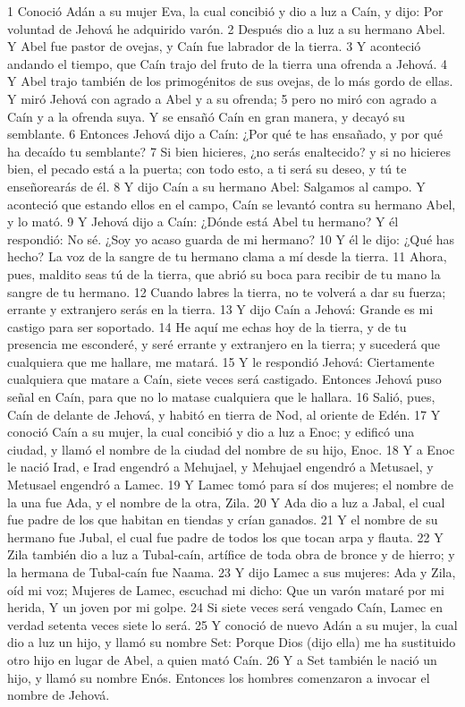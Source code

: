 1 Conoció Adán a su mujer Eva, la cual concibió y dio a luz a Caín, y dijo: Por voluntad de Jehová he adquirido varón.
2 Después dio a luz a su hermano Abel. Y Abel fue pastor de ovejas, y Caín fue labrador de la tierra.
3 Y aconteció andando el tiempo, que Caín trajo del fruto de la tierra una ofrenda a Jehová.
4 Y Abel trajo también de los primogénitos de sus ovejas, de lo más gordo de ellas. Y miró Jehová con agrado a Abel y a su ofrenda;
5 pero no miró con agrado a Caín y a la ofrenda suya. Y se ensañó Caín en gran manera, y decayó su semblante.
6 Entonces Jehová dijo a Caín: ¿Por qué te has ensañado, y por qué ha decaído tu semblante?
7 Si bien hicieres, ¿no serás enaltecido? y si no hicieres bien, el pecado está a la puerta; con todo esto, a ti será su deseo, y tú te enseñorearás de él.
8 Y dijo Caín a su hermano Abel: Salgamos al campo. Y aconteció que estando ellos en el campo, Caín se levantó contra su hermano Abel, y lo mató.
9 Y Jehová dijo a Caín: ¿Dónde está Abel tu hermano? Y él respondió: No sé. ¿Soy yo acaso guarda de mi hermano?
10 Y él le dijo: ¿Qué has hecho? La voz de la sangre de tu hermano clama a mí desde la tierra.
11 Ahora, pues, maldito seas tú de la tierra, que abrió su boca para recibir de tu mano la sangre de tu hermano.
12 Cuando labres la tierra, no te volverá a dar su fuerza; errante y extranjero serás en la tierra.
13 Y dijo Caín a Jehová: Grande es mi castigo para ser soportado.
14 He aquí me echas hoy de la tierra, y de tu presencia me esconderé, y seré errante y extranjero en la tierra; y sucederá que cualquiera que me hallare, me matará.
15 Y le respondió Jehová: Ciertamente cualquiera que matare a Caín, siete veces será castigado. Entonces Jehová puso señal en Caín, para que no lo matase cualquiera que le hallara.
16 Salió, pues, Caín de delante de Jehová, y habitó en tierra de Nod, al oriente de Edén.
17 Y conoció Caín a su mujer, la cual concibió y dio a luz a Enoc; y edificó una ciudad, y llamó el nombre de la ciudad del nombre de su hijo, Enoc.
18 Y a Enoc le nació Irad, e Irad engendró a Mehujael, y Mehujael engendró a Metusael, y Metusael engendró a Lamec.
19 Y Lamec tomó para sí dos mujeres; el nombre de la una fue Ada, y el nombre de la otra, Zila.
20 Y Ada dio a luz a Jabal, el cual fue padre de los que habitan en tiendas y crían ganados.
21 Y el nombre de su hermano fue Jubal, el cual fue padre de todos los que tocan arpa y flauta.
22 Y Zila también dio a luz a Tubal-caín, artífice de toda obra de bronce y de hierro; y la hermana de Tubal-caín fue Naama.
23 Y dijo Lamec a sus mujeres:
Ada y Zila, oíd mi voz;
Mujeres de Lamec, escuchad mi dicho:
Que un varón mataré por mi herida,
Y un joven por mi golpe.
24 Si siete veces será vengado Caín,
Lamec en verdad setenta veces siete lo será.
25 Y conoció de nuevo Adán a su mujer, la cual dio a luz un hijo, y llamó su nombre Set: Porque Dios (dijo ella) me ha sustituido otro hijo en lugar de Abel, a quien mató Caín.
26 Y a Set también le nació un hijo, y llamó su nombre Enós. Entonces los hombres comenzaron a invocar el nombre de Jehová.

